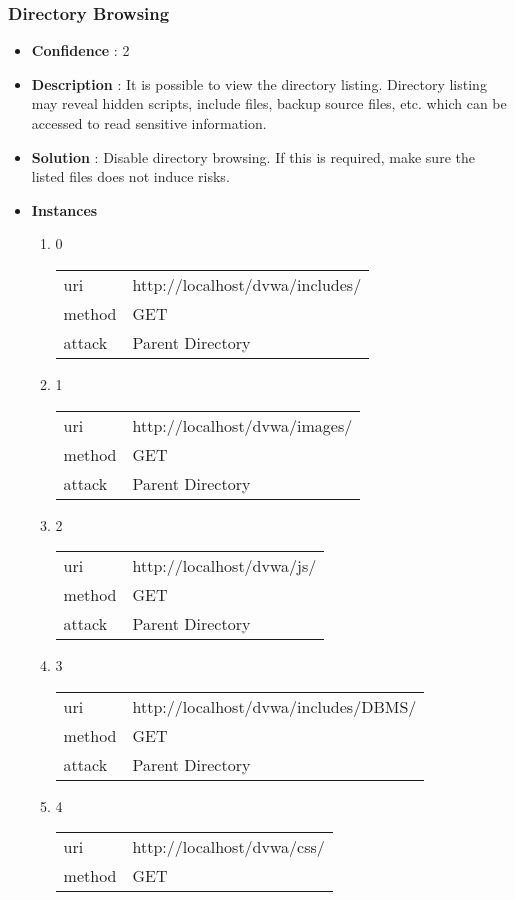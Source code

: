 \documentclass[10pt]{article}
\begin{document}
\subsubsection{Directory Browsing}
\begin{itemize}
\item[] \textbf{Confidence} : 2
\item[] \textbf{Description} : It is possible to view the directory listing.  Directory listing may reveal hidden scripts, include files, backup source files, etc. which can be accessed to read sensitive information.
\item[] \textbf{Solution} :  Disable directory browsing.  If this is required, make sure the listed files does not induce risks.
\item[] \textbf{Instances}
\begin{enumerate}
\item[] 0
\begin{tabular}{| l | p{14cm}}
uri & http://localhost/dvwa/includes/ \\
method & GET \\
attack & Parent Directory \\
\end{tabular}
\item[] 1
\begin{tabular}{| l | p{14cm}}
uri & http://localhost/dvwa/images/ \\
method & GET \\
attack & Parent Directory \\
\end{tabular}
\item[] 2
\begin{tabular}{| l | p{14cm}}
uri & http://localhost/dvwa/js/ \\
method & GET \\
attack & Parent Directory \\
\end{tabular}
\item[] 3
\begin{tabular}{| l | p{14cm}}
uri & http://localhost/dvwa/includes/DBMS/ \\
method & GET \\
attack & Parent Directory \\
\end{tabular}
\item[] 4
\begin{tabular}{| l | p{14cm}}
uri & http://localhost/dvwa/css/ \\
method & GET \\

\end{tabular}
\end{enumerate}
\end{itemize}
\end{document}
